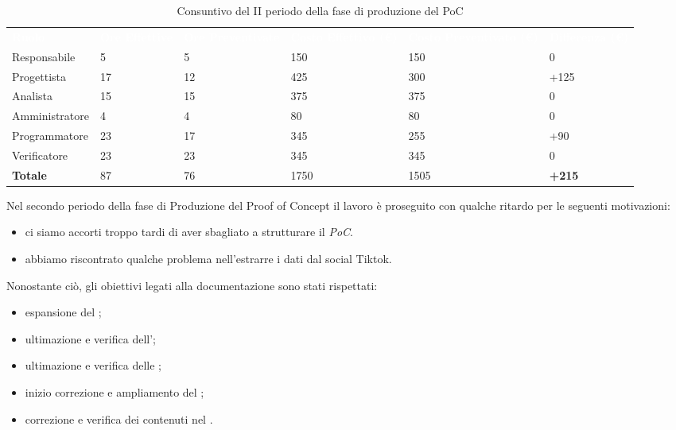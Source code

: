 \begin{table}[H]
\begin{center}
\renewcommand{\arraystretch}{1.5}
\begin{tabular}{ m{}<{\centering}  m{}<{\centering} m{}<{\centering} m{}<{\centering} m{}<{\centering} m{}<{\centering}}
	\rowcolor{darkblue}
	\textcolor{white}{\textbf{Ruolo}} & \textcolor{white}{\textbf{Ore Effettive}} & \textcolor{white}{\textbf{Ore Preventivate}}&\textcolor{white}{\textbf{Costo Effettivo (\euro)}}&\textcolor{white}{\textbf{Costo Preventivato (\euro)}}&\textcolor{white}{\textbf{Differenza (\euro)}}\\ 
	
	Responsabile  & 5 & 5 & 150 & 150 & 0 \\	
	
	Progettista & 17 & 12 & 425 & 300 & +125 \\
	
	Analista & 15 & 15 & 375 & 375 & 0 \\

	Amministratore & 4 & 4 & 80 & 80 & 0 \\
	
	Programmatore & 23 & 17 & 345 & 255 & +90 \\
	
	Verificatore & 23 & 23 & 345 & 345 & 0 \\
	
	\textbf{Totale} & 87 & 76 & 1750 & 1505 & \textbf{+215} \\
	
\end{tabular}
\caption{Consuntivo del II periodo della fase di produzione del PoC}
\end{center}
\end{table}

Nel secondo periodo della fase di Produzione del Proof of Concept il lavoro è proseguito con qualche ritardo per le seguenti motivazioni:
\begin{itemize}
\item ci siamo accorti troppo tardi di aver sbagliato a strutturare il \textit{PoC}. 
\item abbiamo riscontrato qualche problema nell'estrarre i dati dal social Tiktok.
\end{itemize}
Nonostante ciò, gli obiettivi legati alla documentazione sono stati rispettati:
\begin{itemize}
\item espansione del \glo{};
\item ultimazione e verifica dell'\AdR{};
\item ultimazione e verifica delle \NdP{};
\item inizio correzione e ampliamento del \PdP{};
\item correzione e verifica dei contenuti nel \PdQ{}.
\end{itemize}

